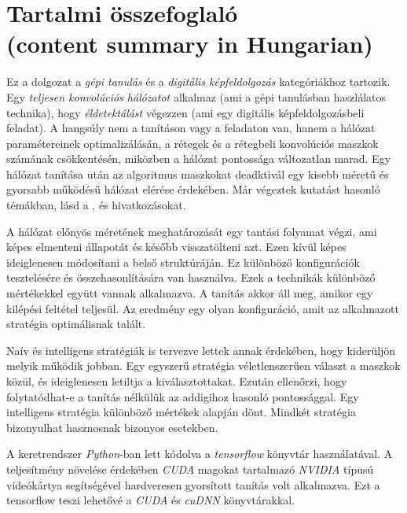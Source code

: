 \documentclass[12pt]{report}
\begin{document}
\begingroup
	\hypersetup{hidelinks}
	\tableofcontents
\endgroup


\chapter*{Tartalmi összefoglaló\\(content summary in Hungarian)}

Ez a dolgozat a \textit{gépi tanulás} és a \textit{digitális képfeldolgozás} kategóriákhoz tartozik. Egy \textit{teljesen konvolúciós hálózatot} alkalmaz (ami a gépi tanulásban haszlálatos technika), hogy \textit{éldetektálást} végezzen (ami egy digitális képfeldolgozásbeli feladat). A hangsúly nem a tanításon vagy a feladaton van, hanem a hálózat paramétereinek optimalizálásán,   a rétegek és a rétegbeli konvolúciós maszkok számának csökkentésén, miközben a hálózat pontossága változatlan marad. Egy hálózat tanítása után az algoritmus maszkokat deadktivál egy kisebb méretű és gyorsabb működésű hálózat elérése érdekében. Már végeztek kutatást hasonló témákban, lásd a \cite{pruning_web}, \cite{pruning_arxiv} és \cite{understanding} hivatkozásokat.

A hálózat előnyös méretének meghatározását egy tantási folyamat végzi, ami képes elmenteni állapotát és később visszatölteni azt. Ezen kívül képes ideiglenesen módosítani a belső struktúráján. Ez különböző konfigurációk tesztelésére és összehasonlítására van használva. Ezek a technikák különböző mértékekkel együtt vannak alkalmazva. A tanítás akkor áll meg, amikor egy kilépési feltétel teljesül. Az eredmény egy olyan konfiguráció, amit az alkalmazott stratégia optimálisnak talált.

Naív és intelligens stratégiák is tervezve lettek annak érdekében, hogy kiderüljön melyik működik jobban. Egy egyszerű stratégia véletlenszerűen választ a maszkok közül, és ideiglenesen letiltja a kiválasztottakat. Ezután ellenőrzi, hogy folytatódhat-e a tanítás nélkülük az addigihoz hasonló pontossággal. Egy intelligens stratégia különböző mértékek alapján dönt. Mindkét stratégia bizonyulhat hasznosnak bizonyos esetekben.

A keretrendszer \textit{Python}-ban lett kódolva a \textit{tensorflow} könyvtár \cite{tensorflow2015-whitepaper} használatával. A teljesítmény növelése érdekében \textit{CUDA} magokat tartalmazó \textit{NVIDIA} típusú videókártya segítségével hardveresen gyorsított tanítás volt alkalmazva. Ezt a tensorflow teszi lehetővé a \textit{CUDA} és \textit{cuDNN} könyvtárakkal.
\end{document}
